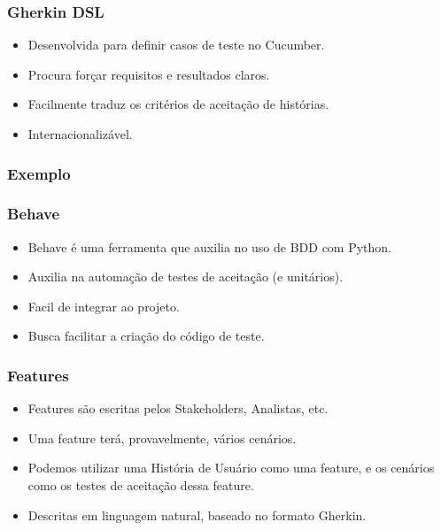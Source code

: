 \begin{frame}
    \frametitle{Gherkin DSL}
    \begin{itemize}
        \item Desenvolvida para definir casos de teste no Cucumber.
        \item Procura forçar requisitos e resultados claros.
        \item Facilmente traduz os critérios de aceitação de histórias.
        \item Internacionalizável.
    \end{itemize}
\end{frame}

\begin{frame}
    \frametitle{Exemplo}
\end{frame}

\begin{frame}
    \frametitle{Behave}
    \begin{itemize}
        \item Behave é uma ferramenta que auxilia no uso de BDD com Python.
        \item Auxilia na automação de testes de aceitação (e unitários).
        \item Facil de integrar ao projeto.
        \item Busca facilitar a criação do código de teste.
    \end{itemize}
\end{frame}

\begin{frame}
    \frametitle{Features}
    \begin{itemize}
        \item Features são escritas pelos Stakeholders, Analistas, etc.
        \item Uma feature terá, provavelmente, vários cenários.
        \item Podemos utilizar uma História de Usuário como uma feature,
        e os cenários como os testes de aceitação dessa feature.
        \item Descritas em linguagem natural, baseado no formato Gherkin.
    \end{itemize}
\end{frame}


